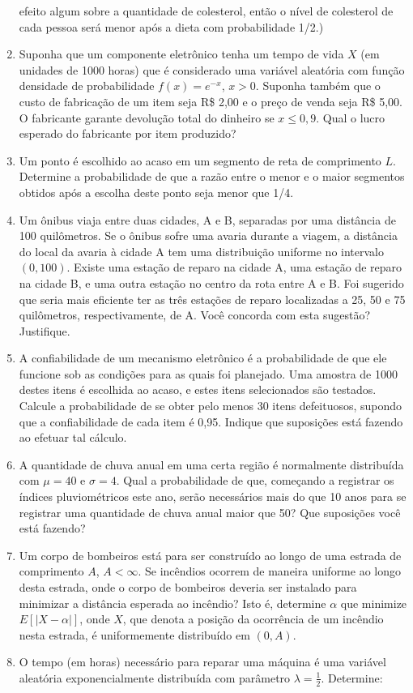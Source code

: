 \documentclass[
  10pt,
]{article}
\begin{document}
\begin{enumerate}
  efeito algum sobre a quantidade de colesterol, então o nível de
  colesterol de cada pessoa será menor após a dieta com probabilidade
  1/2.)
\item
  Suponha que um componente eletrônico tenha um tempo de vida \(X\) (em
  unidades de 1000 horas) que é considerado uma variável aleatória com
  função densidade de probabilidade \(f(x) = e^{-x}\), \(x > 0\).
  Suponha também que o custo de fabricação de um item seja R\$ 2,00 e o
  preço de venda seja R\$ 5,00. O fabricante garante devolução total do
  dinheiro se \(x \leq 0,9\). Qual o lucro esperado do fabricante por
  item produzido?
\item
  Um ponto é escolhido ao acaso em um segmento de reta de comprimento
  \(L\). Determine a probabilidade de que a razão entre o menor e o
  maior segmentos obtidos após a escolha deste ponto seja menor que 1/4.
\item
  Um ônibus viaja entre duas cidades, A e B, separadas por uma distância
  de 100 quilômetros. Se o ônibus sofre uma avaria durante a viagem, a
  distância do local da avaria à cidade A tem uma distribuição uniforme
  no intervalo \((0, 100)\). Existe uma estação de reparo na cidade A,
  uma estação de reparo na cidade B, e uma outra estação no centro da
  rota entre A e B. Foi sugerido que seria mais eficiente ter as três
  estações de reparo localizadas a 25, 50 e 75 quilômetros,
  respectivamente, de A. Você concorda com esta sugestão? Justifique.
\item
  A confiabilidade de um mecanismo eletrônico é a probabilidade de que
  ele funcione sob as condições para as quais foi planejado. Uma amostra
  de 1000 destes itens é escolhida ao acaso, e estes itens selecionados
  são testados. Calcule a probabilidade de se obter pelo menos 30 itens
  defeituosos, supondo que a confiabilidade de cada item é 0,95. Indique
  que suposições está fazendo ao efetuar tal cálculo.
\item
  A quantidade de chuva anual em uma certa região é normalmente
  distribuída com \(\mu = 40\) e \(\sigma = 4\). Qual a probabilidade de
  que, começando a registrar os índices pluviométricos este ano, serão
  necessários mais do que 10 anos para se registrar uma quantidade de
  chuva anual maior que 50? Que suposições você está fazendo?
\item
  Um corpo de bombeiros está para ser construído ao longo de uma estrada
  de comprimento \(A\), \(A < \infty\). Se incêndios ocorrem de maneira
  uniforme ao longo desta estrada, onde o corpo de bombeiros deveria ser
  instalado para minimizar a distância esperada ao incêndio? Isto é,
  determine \(\alpha\) que minimize \(E[|X - \alpha|]\), onde \(X\), que
  denota a posição da ocorrência de um incêndio nesta estrada, é
  uniformemente distribuído em \((0, A)\).
\item
  O tempo (em horas) necessário para reparar uma máquina é uma variável
  aleatória exponencialmente distribuída com parâmetro
  \(\lambda = \frac{1}{2}\). Determine:


\end{enumerate}
\end{document}
